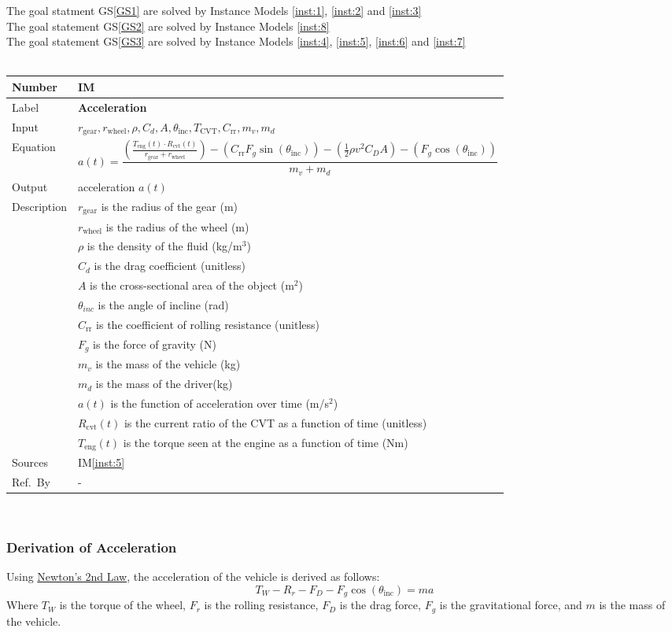 \documentclass[12pt]{article}
\newcommand{\colAwidth}{0.13\textwidth}
\newcommand{\colBwidth}{0.82\textwidth}
\newcounter{instnum} %
\newcommand{\iref}[1]{IM\ref{#1}}
\newcommand{\definstance}[7] {
~\newline
\noindent
\begin{minipage}{\textwidth}
\renewcommand*{\arraystretch}{1.5}
\begin{tabular}{| p{\colAwidth} | p{\colBwidth}|}
  \hline
  \rowcolor[gray]{0.9}
  Number& IM\refstepcounter{instnum}\theinstnum \label{inst:\theinstnum}\\
  \hline
  Label& \bf #1 \\
  \hline
  Input& #2\\
  \hline
  Equation& #3\\
  \hline
  Output& #4\\
  \hline
  Description& #5 \\
  \hline
  Sources& #6 \\
  \hline
  Ref.\ By & #7\\
  \hline
\end{tabular}
\end{minipage}\\
}
\begin{document}
{\noindent}The goal statment GS\ref{GS1} are solved by Instance Models \ref{inst:1}, \ref{inst:2} and \ref{inst:3}\\
{\noindent}The goal statement GS\ref{GS2} are solved by Instance Models \ref{inst:8}\\
The goal statement GS\ref{GS3} are solved by Instance Models \ref{inst:4}, \ref{inst:5}, \ref{inst:6} and \ref{inst:7}\\
  \definstance
  {Acceleration}
  {$r_{\text{gear}}, r_{\text{wheel}}, \rho, C_d, A, \theta_{\text{inc}}, T_{\text{CVT}}, C_{\text{rr}}, m_v, m_d$}
  {
    \[ a(t) = \frac{\left( \frac{T_{\text{eng}}(t) \cdot R_\text{cvt}(t)}{r_{\text{gear}} + r_{\text{wheel}}} \right) - (C_{\text{rr}} F_g \sin(\theta_\text{inc})) - \left( \frac{1}{2} \rho v^2 C_D A \right) - (F_g \cos(\theta_\text{inc}))}{m_v + m_d} \]
    }
  {acceleration $a(t)$}
  {
  $r_{\text{gear}}$ is the radius of the gear (m)\\
  & $r_{\text{wheel}}$ is the radius of the wheel (m)\\
  & $\rho$ is the density of the fluid (kg/m$^3$)\\
  & $C_d$ is the drag coefficient (unitless)\\
  & $A$ is the cross-sectional area of the object (m$^2$)\\
  & $\theta_{inc}$ is the angle of incline (rad)\\
  & $C_{\text{rr}}$ is the coefficient of rolling resistance (unitless)\\
  & $F_g$ is the force of gravity (N)\\
  & $m_v$ is the mass of the vehicle (kg)\\
  & $m_d$ is the mass of the driver(kg)\\
  & $a(t)$ is the function of acceleration over time (m/s$^2$)\\
  & $R_\text{cvt}(t)$ is the current ratio of the CVT as a function of time (unitless)\\
  & $T_{\text{eng}}(t)$ is the torque seen at the engine as a function of time (Nm)
}
  {\iref{inst:5}}
  {-}
  
  
  \subsubsection*{Derivation of Acceleration}

Using \hyperref[TM:N2]{Newton's 2nd Law}, the acceleration of the vehicle is derived as follows: 
\[
T_W - R_r - F_D - F_g \cos(\theta_\text{inc}) = ma
\]
Where \( T_W \) is the torque of the wheel, \( F_r \) is the rolling resistance, \( F_D \) is the drag force, \( F_g \) is the gravitational force, and \( m \) is the mass of the vehicle. 
\end{document}
